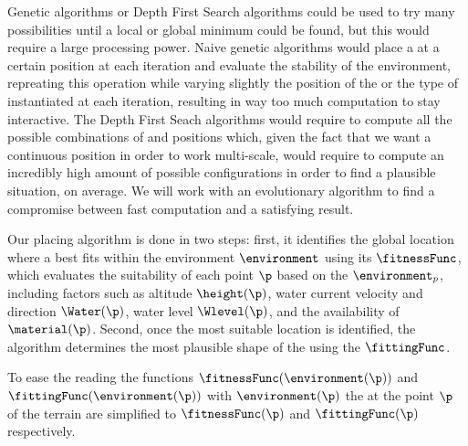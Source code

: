 Genetic algorithms or Depth First Search algorithms could be used to try many possibilities until a local or global minimum could be found, but this would require a large processing power. Naive genetic algorithms would place a  at a certain position at each iteration and evaluate the stability of the environment, repreating this operation while varying slightly the position of the  or the type of  instantiated at each iteration, resulting in way too much computation to stay interactive. The Depth First Seach algorithms would require to compute all the possible combinations of  and positions which, given the fact that we want a continuous position in order to work multi-scale, would require to compute an incredibly high amount of possible configurations in order to find a plausible situation, on average. We will work with an evolutionary algorithm to find a compromise between fast computation and a satisfying result.

Our placing algorithm is done in two steps: first, it identifies the global location where a  best fits within the environment $\environment$ using its  $\fitnessFunc$, which evaluates the suitability of each point $\p$ based on the  $\environment_p$, including factors such as altitude $\height(\p)$, water current velocity and direction $\Water(\p)$, water level $\Wlevel(\p)$, and the availability of  $\material(\p)$. Second, once the most suitable location is identified, the algorithm determines the most plausible shape of the  using the  $\fittingFunc$.

To ease the reading the functions $\fitnessFunc(\environment(\p))$ and $\fittingFunc(\environment(\p))$ with $\environment(\p)$ the  at the point $\p$ of the terrain are simplified to $\fitnessFunc(\p)$ and $\fittingFunc(\p)$ respectively.



